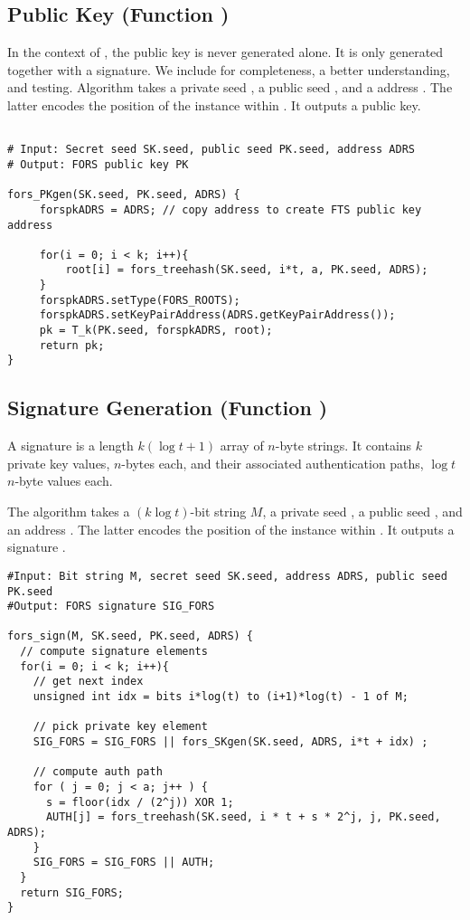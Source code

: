 \subsection{\fors Public Key (Function \forspkgen)}
In the context of \spx, the \fors public key is never generated alone. It is
only generated together with a signature. We include \forspkgen
for completeness, a better understanding, and testing. Algorithm \forspkgen takes
a private seed \sseed, a public seed \pseed, and a \fors address \adrs. The
latter encodes the position of the \fors instance within \spx. It outputs a
\fors public key.

\begin{lstlisting}[label=alg:fors:pkgen, language=pseudoc,
                   caption=\forspkgen\ -- Generate a FORS public key.]

# Input: Secret seed SK.seed, public seed PK.seed, address ADRS
# Output: FORS public key PK

fors_PKgen(SK.seed, PK.seed, ADRS) {
     forspkADRS = ADRS; // copy address to create FTS public key address

     for(i = 0; i < k; i++){
         root[i] = fors_treehash(SK.seed, i*t, a, PK.seed, ADRS);
     }
     forspkADRS.setType(FORS_ROOTS);
     forspkADRS.setKeyPairAddress(ADRS.getKeyPairAddress());
     pk = T_k(PK.seed, forspkADRS, root);
     return pk;
}
\end{lstlisting}

\subsection{\fors Signature Generation (Function \forssign)}
A \fors signature is a length $k(\log t + 1)$ array of $n$-byte strings. It contains
$k$ private key values, $n$-bytes each, and their associated authentication
paths, $\log t$ $n$-byte values each.

The algorithm \forssign takes a $(k\log t)$-bit string $M$, a private seed \sseed,
a public seed \pseed, and an address \adrs. The latter encodes the position of
the \fors instance within \spx. It outputs a \fors signature \forssig.

\begin{lstlisting}[label=alg:fors_sign, language=pseudoc,
                   caption=\forssign\ -- Generating a FORS signature on string $M$.]
#Input: Bit string M, secret seed SK.seed, address ADRS, public seed PK.seed
#Output: FORS signature SIG_FORS

fors_sign(M, SK.seed, PK.seed, ADRS) {
  // compute signature elements
  for(i = 0; i < k; i++){
    // get next index
    unsigned int idx = bits i*log(t) to (i+1)*log(t) - 1 of M;

    // pick private key element
    SIG_FORS = SIG_FORS || fors_SKgen(SK.seed, ADRS, i*t + idx) ;

    // compute auth path
    for ( j = 0; j < a; j++ ) {
      s = floor(idx / (2^j)) XOR 1;
      AUTH[j] = fors_treehash(SK.seed, i * t + s * 2^j, j, PK.seed, ADRS);
    }
    SIG_FORS = SIG_FORS || AUTH;
  }
  return SIG_FORS;
}
\end{lstlisting}


